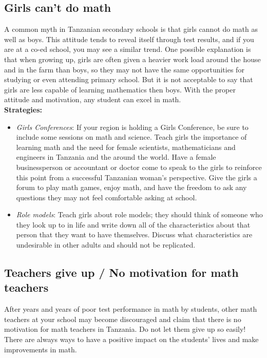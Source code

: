 \subsection{Girls can't do math}
A common myth in Tanzanian secondary schools is that girls cannot do math as well as boys. This attitude tends to reveal itself through test results, and if you are at a co-ed school, you may see a similar trend. One possible explanation is that when growing up, girls are often given a heavier work load around the house and in the farm than boys, so they may not have the same opportunities for studying or even attending primary school. But it is not acceptable to say that girls are less capable of learning mathematics then boys. With the proper attitude and motivation, any student can excel in math.\\

\textbf{Strategies:}
\begin{itemize}
\item\emph{Girls Conferences}: If your region is holding a Girls Conference, be sure to include some sessions on math and science. Teach girls the importance of learning math and the need for female scientists, mathematicians and engineers in Tanzania and the around the world. Have a female businessperson or accountant or doctor come to speak to the girls to reinforce this point from a successful Tanzanian woman's perspective. Give the girls a forum to play math games, enjoy math, and have the freedom to ask any questions they may not feel comfortable asking at school.

\item\emph{Role models}: Teach girls about role models; they should think of someone who they look up to in life and write down all of the characteristics about that person that they want to have themselves. Discuss what characteristics are undesirable in other adults and should not be replicated.

\end{itemize}

\subsection{Teachers give up / No motivation for math teachers}
After years and years of poor test performance in math by students, other math teachers at your school may become discouraged and claim that there is no motivation for math teachers in Tanzania. Do not let them give up so easily! There are always ways to have a positive impact on the students' lives and make improvements in math.\\

